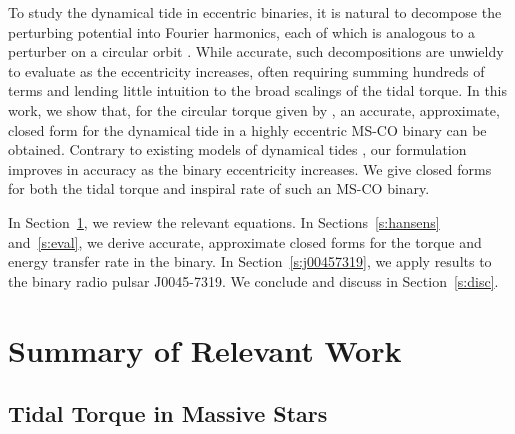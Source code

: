 \documentclass[
        fleqn,
        usenatbib,
    ]{mnras}
\begin{document}
To study the dynamical tide in eccentric binaries, it is natural to decompose
the perturbing potential into Fourier harmonics, each of which is analogous to a
perturber on a circular orbit \citep[e.g.][]{sl, vlf}. While accurate, such
decompositions are unwieldy to evaluate as the eccentricity increases, often
requiring summing hundreds of terms and lending little intuition to the broad
scalings of the tidal torque. In this work, we show that, for the circular
torque given by \citet{kushnir}, an accurate, approximate, closed form for the
dynamical tide in a highly eccentric MS-CO binary can be obtained. Contrary to
existing models of dynamical tides \citep[e.g.][]{vigna2020common}, our
formulation improves in accuracy as the binary eccentricity increases.  We give
closed forms for both the tidal torque and inspiral rate of such an MS-CO
binary.

In Section~\ref{s:background}, we review the relevant equations. In
Sections~\ref{s:hansens} and~\ref{s:eval}, we derive accurate, approximate
closed forms for the torque and energy transfer rate in the binary. In
Section~\ref{s:j00457319}, we apply results to the binary radio pulsar
J0045-7319. We conclude and discuss in Section~\ref{s:disc}.%

\section{Summary of Relevant Work}\label{s:background}

\subsection{Tidal Torque in Massive Stars}
\end{document}
